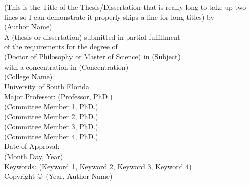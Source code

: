 \documentclass[
  10pt,
]{report}
\author{}
\date{\vspace{-2.5em}}
\begin{document}
\begin{centering}
\vspace*{0.55in} %
\doublespacing %
(This is the Title of the Thesis/Dissertation that is really long to take up two lines so I can demonstrate it properly skips a line for long titles)
\singlespacing
\vspace{\baselineskip}
\vspace{\baselineskip}
\vspace{\baselineskip}
by\\
\vspace{\baselineskip}
\vspace{\baselineskip}
\vspace{\baselineskip}
(Author Name)\\
\vspace{\baselineskip}
\vspace{\baselineskip}
\vspace{\baselineskip}
\vspace{\baselineskip}
A (thesis or dissertation) submitted in partial fulfillment \\
of the requirements for the degree of \\
(Doctor of Philosophy or Master of Science) in (Subject) \\
with a concentration in (Concentration) \\
(College Name) \\
University of South Florida\\
\vspace{\baselineskip}
\vspace{\baselineskip}
Major Professor: (Professor, PhD.) \\
(Committee Member 1, PhD.) \\
(Committee Member 2, PhD.) \\
(Committee Member 3, PhD.) \\
(Committee Member 4, PhD.) \\
\vspace{\baselineskip}
\vspace{\baselineskip}
Date of Approval: \\
(Month Day, Year)\\
\vspace{\baselineskip}
\vspace{\baselineskip}
\vspace{\baselineskip}
Keywords: (Keyword 1, Keyword 2, Keyword 3, Keyword 4)\\
\vspace{\baselineskip}
Copyright \copyright\ (Year, Author Name) \\
\end{centering}
\end{document}
